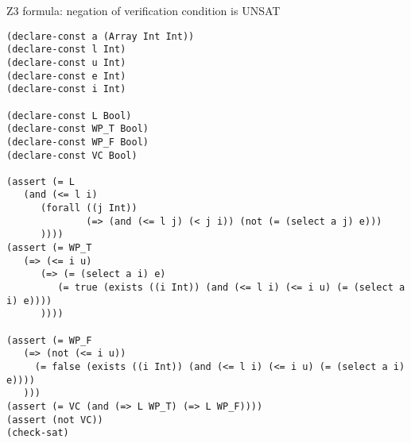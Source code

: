 \documentclass{article}
\begin{document}
\begin{enumerate}
\begin{enumerate}[(1)]
\newpage

	Z3 formula: negation of verification condition is UNSAT
\begin{verbatim}
(declare-const a (Array Int Int))
(declare-const l Int)
(declare-const u Int)
(declare-const e Int)
(declare-const i Int)

(declare-const L Bool)
(declare-const WP_T Bool)
(declare-const WP_F Bool)
(declare-const VC Bool)

(assert (= L
   (and (<= l i)
      (forall ((j Int))
              (=> (and (<= l j) (< j i)) (not (= (select a j) e)))
      ))))
(assert (= WP_T
   (=> (<= i u)
      (=> (= (select a i) e)
         (= true (exists ((i Int)) (and (<= l i) (<= i u) (= (select a i) e))))
      ))))

(assert (= WP_F
   (=> (not (<= i u))
     (= false (exists ((i Int)) (and (<= l i) (<= i u) (= (select a i) e))))
   )))
(assert (= VC (and (=> L WP_T) (=> L WP_F))))
(assert (not VC))
(check-sat)
\end{verbatim}


\end{enumerate}
\end{enumerate}
\end{document}
